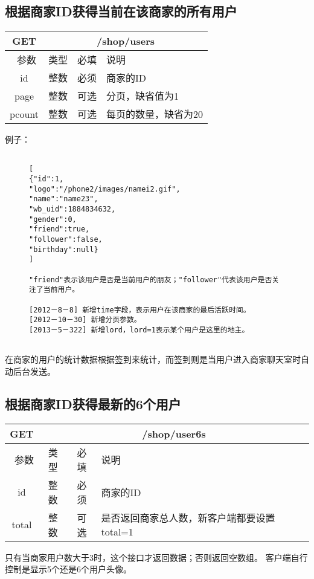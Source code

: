 \documentclass[cs4size]{ctexartutf8}
\begin{document}
\subsection{根据商家ID获得当前在该商家的所有用户}

\begin{table}[H]
   \begin{center}
\begin{tabular}{|c|c|c|p{12cm}|}
\hline
GET & \multicolumn{3}{|c|}{/shop/users} \\
\hline\hline
 \  参数  & 类型 & 必填 &  说明  \\
\hline
 id  & 整数 & 必须 & 商家的ID\\
  \hline
 page  & 整数 & 可选 & 分页，缺省值为1\\ 
 \hline
 pcount  & 整数 & 可选 & 每页的数量，缺省为20\\ 
\hline
\end{tabular}
   \end{center}
\end{table}


例子：

\begin{figure}[H]
\begin{verbatim}

[
{"id":1,
"logo":"/phone2/images/namei2.gif",
"name":"name23",
"wb_uid":1884834632,
"gender":0,
"friend":true,
"follower":false,
"birthday":null}
]

"friend"表示该用户是否是当前用户的朋友；"follower"代表该用户是否关注了当前用户。

[2012－8－8] 新增time字段，表示用户在该商家的最后活跃时间。
[2012－10－30] 新增分页参数。
[2013－5－322] 新增lord，lord=1表示某个用户是这里的地主。


\end{verbatim}
\end{figure}

在商家的用户的统计数据根据签到来统计，而签到则是当用户进入商家聊天室时自动后台发送。



\subsection{根据商家ID获得最新的6个用户}

\begin{table}[H]
   \begin{center}
\begin{tabular}{|c|c|c|p{12cm}|}
\hline
GET & \multicolumn{3}{|c|}{/shop/user6s} \\
\hline\hline
 \  参数  & 类型 & 必填 &  说明  \\
\hline
 id  & 整数 & 必须 & 商家的ID\\
 \hline
 total  & 整数 & 可选 & 是否返回商家总人数，新客户端都要设置total=1\\
\hline
\end{tabular}
   \end{center}
\end{table}
只有当商家用户数大于3时，这个接口才返回数据；否则返回空数组。
客户端自行控制是显示5个还是6个用户头像。
\end{document}
